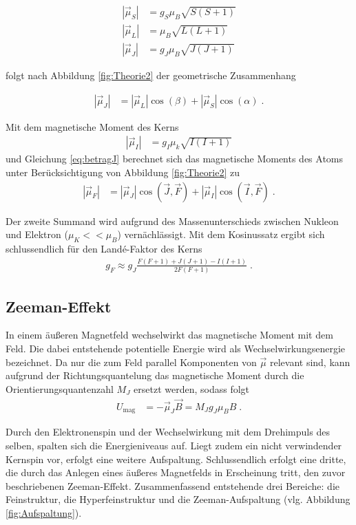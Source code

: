 \begin{align}
	|\vec{\mu}_S|&=g_S\mu_B\sqrt{S(S+1)} \\
	|\vec{\mu}_L|&=\mu_B\sqrt{L(L+1)}\\
	|\vec{\mu}_J|&=g_J\mu_B\sqrt{J(J+1)}
	\label{eq:betragmu1}
\end{align}

folgt nach Abbildung \ref{fig:Theorie2} der geometrische Zusammenhang

\begin{align}
	|\vec{\mu}_J| &= |\vec{\mu}_L| \cos{(\beta)}+ |\vec{\mu}_S| \cos{(\alpha)}\;.
	\label{eq:betragJ}
\end{align}

Mit dem magnetische Moment des Kerns
\begin{align}
	|\vec{\mu}_I|&=g_I\mu_k\sqrt{I(I+1)}
\end{align}
und Gleichung \ref{eq:betragJ} berechnet sich das magnetische Moments des Atoms unter Berücksichtigung von Abbildung \ref{fig:Theorie2}
zu 
\begin{align}
	|\vec{\mu}_F|&=|\vec{\mu}_J|\cos{(\vec{J},\vec{F})} + |\vec{\mu}_I|\cos{(\vec{I},\vec{F})}\;.
	\label{eq:betragF}
\end{align}

Der zweite Summand wird aufgrund des Massenunterschieds zwischen Nukleon und Elektron ($\mu_K<<\mu_B$) vernächlässigt. Mit dem Kosinussatz ergibt sich schlussendlich für den Land\'{e}-Faktor des Kerns
\begin{align}
	g_F \approx g_J \frac{F(F+1)+J(J+1)-I(I+1)}{2F(F+1)}\;.
	\label{eq:11}
\end{align}


\subsection{Zeeman-Effekt}
In einem äußeren Magnetfeld wechselwirkt das magnetische Moment mit dem Feld. Die dabei entstehende potentielle Energie wird als Wechselwirkungsenergie bezeichnet. Da nur die zum Feld parallel Komponenten von $\vec{\mu}$ relevant sind, kann aufgrund der Richtungsquantelung das magnetische Moment durch die Orientierungsquantenzahl $M_J$ ersetzt werden, sodass folgt 
\begin{align}
	U_\textrm{mag}&=-\vec{\mu}_J \vec{B}=M_Jg_J\mu_BB\;.
	\label{eq:7}
\end{align}

Durch den Elektronenspin und der Wechselwirkung mit dem Drehimpuls des selben, spalten sich die Energieniveaus auf. Liegt zudem ein nicht verwindender Kernspin vor, erfolgt eine weitere Aufspaltung. Schlussendlich erfolgt eine dritte, die durch das Anlegen eines äußeres Magnetfelds in Erscheinung tritt, den zuvor beschriebenen Zeeman-Effekt. Zusammenfassend entstehende drei Bereiche: die Feinstruktur, die Hyperfeinstruktur und die Zeeman-Aufspaltung (vlg. Abbildung \ref{fig:Aufspaltung}).

